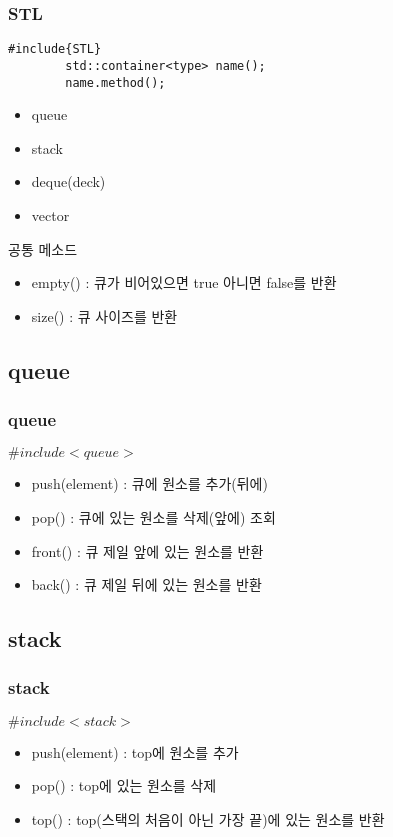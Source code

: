 \documentclass[10pt]{beamer}
\begin{document}
\begin{frame}[fragile]
    \frametitle{STL}
    
    \begin{lstlisting}[style = CStyle]
        #include{STL}
        std::container<type> name();
        name.method();
    \end{lstlisting}

    \begin{itemize}
        \item queue
        \item stack
        \item deque(deck)
        \item vector
    \end{itemize}
    공통 메소드
    \begin{itemize}
        \item empty() : 큐가 비어있으면 true 아니면 false를 반환
        \item size() : 큐 사이즈를 반환
    \end{itemize}
\end{frame}

\subsection{queue}

\begin{frame}
    \frametitle{queue}
    $\#include<queue>$
    \begin{itemize}
        \item push(element) : 큐에 원소를 추가(뒤에)
        \item pop() : 큐에 있는 원소를 삭제(앞에) 조회
        \item front() : 큐 제일 앞에 있는 원소를 반환
        \item back() : 큐 제일 뒤에 있는 원소를 반환
    \end{itemize}
\end{frame}



\subsection{stack}


\begin{frame}
    \frametitle{stack}
    $\#include<stack>$
    \begin{itemize}
        \item push(element) : top에 원소를 추가
        \item pop() : top에 있는 원소를 삭제
        \item top() : top(스택의 처음이 아닌 가장 끝)에 있는 원소를 반환
    \end{itemize}
\end{frame}
\end{document}
